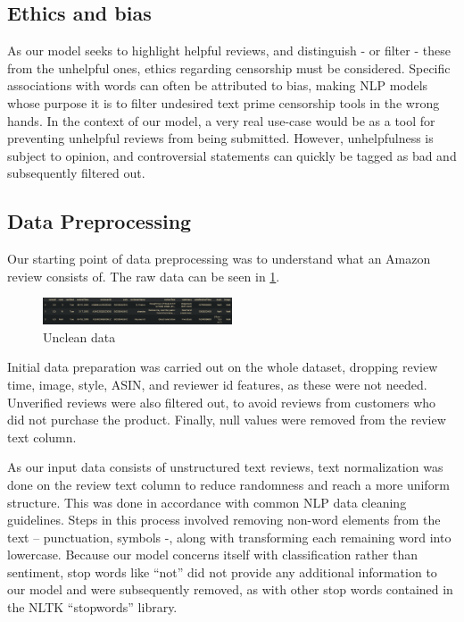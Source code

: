 \documentclass[twoside,twocolumn]{article}
\begin{document}
\subsection{Ethics and bias}
As our model seeks to highlight helpful reviews, and distinguish - or filter - these from the unhelpful ones, ethics regarding censorship must be considered. Specific associations with words can often be attributed to bias, making NLP models whose purpose it is to filter undesired text prime censorship tools in the wrong hands\cite{censorship}. In the context of our model, a very real use-case would be as a tool for preventing unhelpful reviews from being submitted. However, unhelpfulness is subject to opinion, and controversial statements can quickly be tagged as bad and subsequently filtered out.

\subsection{Data Preprocessing}

Our starting point of data preprocessing was to understand what an Amazon review consists of. The raw data can be seen in \figurename{\ref{fig:unclean_data}}.

\begin{figure}[H]
	\centering%
	\begin{center}
		\includegraphics[width=0.5\textwidth]{img/unclean_data.pdf}
		\caption{Unclean data}
		\label{fig:unclean_data}
	\end{center}
\end{figure}
Initial data preparation was carried out on the whole dataset, dropping review time, image, style, ASIN, and reviewer id features, as these were not needed. Unverified reviews were also filtered out, to avoid reviews from customers who did not purchase the product. Finally, null values were removed from the review text column.

As our input data consists of unstructured text reviews, text normalization was done on the review text column to reduce randomness and reach a more uniform structure. This was done in accordance with common NLP data cleaning guidelines\cite{NLP}. Steps in this process involved removing non-word elements from the text – punctuation, symbols -, along with transforming each remaining word into lowercase. Because our model concerns itself with classification rather than sentiment, stop words like “not” did not provide any additional information to our model and were subsequently removed, as with other stop words contained in the NLTK “stopwords” library.
\end{document}
